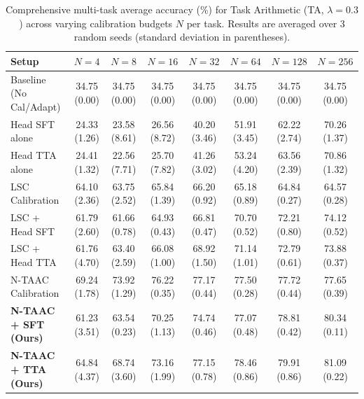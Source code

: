 \documentclass{article}
\theoremstyle{plain}
\theoremstyle{definition}
\theoremstyle{remark}
\begin{document}
\begin{table}[ht]
\centering
\caption{Comprehensive multi-task average accuracy (\%) for Task Arithmetic (TA, $\lambda=0.3$) across varying calibration budgets $N$ per task. Results are averaged over 3 random seeds (standard deviation in parentheses).}
\label{tab:appendix_ta_03}
\vskip 0.15in
\begin{sc}
\begin{scriptsize}
\setlength{\tabcolsep}{3pt}
\begin{tabular}{lccccccc}
\toprule
Setup & $N=4$ & $N=8$ & $N=16$ & $N=32$ & $N=64$ & $N=128$ & $N=256$ \\
\midrule
Baseline (No Cal/Adapt) & 34.75 (0.00) & 34.75 (0.00) & 34.75 (0.00) & 34.75 (0.00) & 34.75 (0.00) & 34.75 (0.00) & 34.75 (0.00) \\
Head SFT alone & 24.33 (1.26) & 23.58 (8.61) & 26.56 (8.72) & 40.20 (3.46) & 51.91 (3.45) & 62.22 (2.74) & 70.26 (1.37) \\
Head TTA alone & 24.41 (1.32) & 22.56 (7.71) & 25.70 (7.82) & 41.26 (3.02) & 53.24 (4.20) & 63.56 (2.39) & 70.86 (1.32) \\
LSC Calibration & 64.10 (2.36) & 63.75 (2.52) & 65.84 (1.39) & 66.20 (0.92) & 65.18 (0.89) & 64.84 (0.27) & 64.57 (0.28) \\
LSC + Head SFT & 61.79 (2.60) & 61.66 (0.78) & 64.93 (0.43) & 66.81 (0.47) & 70.70 (0.52) & 72.21 (0.80) & 74.12 (0.52) \\
LSC + Head TTA & 61.76 (4.70) & 63.40 (2.59) & 66.08 (1.00) & 68.92 (1.50) & 71.14 (1.01) & 72.79 (0.61) & 73.88 (0.37) \\
N-TAAC Calibration & 69.24 (1.78) & 73.92 (1.29) & 76.22 (0.35) & 77.17 (0.44) & 77.50 (0.28) & 77.72 (0.44) & 77.65 (0.39) \\
\textbf{N-TAAC + SFT (Ours)} & 61.23 (3.51) & 63.54 (0.23) & 70.25 (1.13) & 74.74 (0.46) & 77.07 (0.48) & 78.81 (0.42) & 80.34 (0.11) \\
\textbf{N-TAAC + TTA (Ours)} & 64.84 (4.37) & 68.74 (3.60) & 73.16 (1.99) & 77.15 (0.78) & 78.46 (0.86) & 79.91 (0.86) & 81.09 (0.22) \\
\bottomrule
\end{tabular}
\end{scriptsize}
\end{sc}
\end{table}
\end{document}
